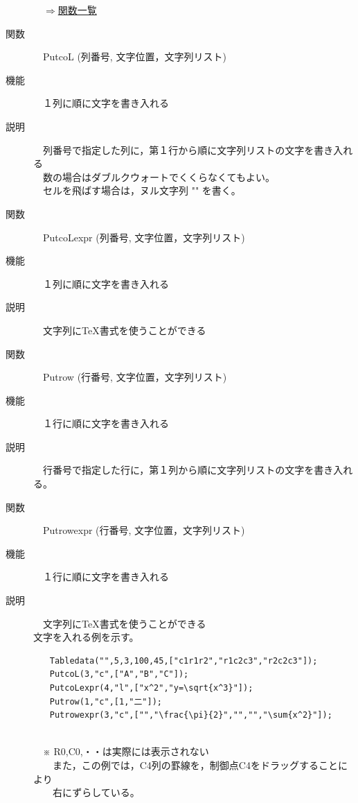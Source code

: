 \documentclass[papersize,a4paper,12pt,uplatex]{jsarticle}
\begin{document}
\begin{description}
\begin{flushright}　\hyperlink{functionlist}{$\Rightarrow$関数一覧}\end{flushright}

\hypertarget{putcol}{}
\item[関数]　PutcoL (列番号, 文字位置，文字列リスト)
\item[機能]　１列に順に文字を書き入れる
\item[説明]　列番号で指定した列に，第１行から順に文字列リストの文字を書き入れる\\
　数の場合はダブルクウォートでくくらなくてもよい。\\
　セルを飛ばす場合は，ヌル文字列 "" を書く。\\


\hypertarget{putcolexpr}{}
\item[関数]　PutcoLexpr (列番号, 文字位置，文字列リスト)
\item[機能]　１列に順に文字を書き入れる
\item[説明]　文字列に\TeX 書式を使うことができる\\

\hypertarget{putrow}{}
\item[関数]　Putrow (行番号, 文字位置，文字列リスト)
\item[機能]　１行に順に文字を書き入れる
\item[説明]　行番号で指定した行に，第１列から順に文字列リストの文字を書き入れる。\\


\hypertarget{putrowexpr}{}
\item[関数]　Putrowexpr (行番号, 文字位置，文字列リスト)
\item[機能]　１行に順に文字を書き入れる
\item[説明]　文字列に\TeX 書式を使うことができる\\

文字を入れる例を示す。
\begin{verbatim}
　　Tabledata("",5,3,100,45,["c1r1r2","r1c2c3","r2c2c3"]);
　　PutcoL(3,"c",["A","B","C"]);
　　PutcoLexpr(4,"l",["x^2","y=\sqrt{x^3}"]);
　　Putrow(1,"c",[1,"二"]);
　　Putrowexpr(3,"c",["","\frac{\pi}{2}","","","\sum{x^2}"]);
\end{verbatim}

　　　　　\\

　※ R0,C0,・・は実際には表示されない\\
　　また，この例では，C4列の罫線を，制御点C4をドラッグすることにより\\
　　右にずらしている。\\
\\


\end{description}
\end{document}
